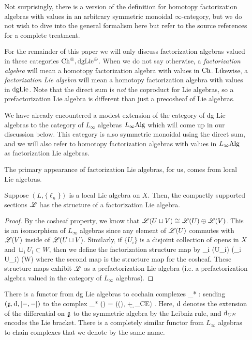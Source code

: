 \documentclass[10pt]{amsart}
\begin{document}
Not surprisingly, there is a version of the definition for homotopy factorization algebras with values in an arbitrary symmetric monoidal $\infty$-category, but we do not wish to dive into the general formalism here but refer to the source references \cite{AF1, LurieHA,..} for a complete treatment.

For the remainder of this paper we will only discuss factorization algebras valued in these categories ${\rm Ch}^\otimes, {\rm dgLie}^{\oplus}$.
When we do not say otherwise, a {\em factorization algebra} will mean a homotopy factorization algebra with values in ${\rm Ch}$. 
Likewise, a {\em factorization Lie algebra} will mean a homotopy factorization algebra with values in ${\rm dgLie}$. 
Note that the direct sum is {\em not} the coproduct for Lie algebras, so a prefactorization Lie algebra is different than just a precosheaf of Lie algebras. 

We have already encountered a modest extension of the category of dg Lie algebras to the category of $L_\infty$ algebras $L_\infty{\rm Alg}$ which will come up in our discussion below.
This category is also symmetric monoidal using the direct sum, and we will also refer to homotopy factorization algebras with values in $L_\infty{\rm Alg}$ as factorization Lie algebras.

The primary appearance of factorization Lie algebras, for us, comes from local Lie algebras.
 
\begin{lem}
Suppose $(L, \{\ell_n\})$ is a local Lie algebra on $X$.
Then, the compactly supported sections $\mathscr L$ has the structure of a factorization Lie algebra.
\end{lem}
\begin{proof}
By the cosheaf property, we know that $\mathscr L(U \sqcup V) \cong \mathscr L(U) \oplus \mathscr L(V)$. 
This is an isomorphism of $L_\infty$ algebras since any element of $\mathscr L(U)$ commutes with $\mathscr L(V)$ inside of $\mathscr L(U \sqcup V)$. 
Similarly, if $\{U_i\}$ is a disjoint collection of opens in $X$ and $\sqcup_i U_i \subset W$, then we define the factorization structure map by
\ben
\oplus_i \sL(U_i) \cong \sL(\sqcup_i U_i) \to \sL (W)
\een
where the second map is the structure map for the cosheaf. 
These structure maps exhibit $\mathscr L$ as a prefactorization Lie algebra (i.e. a prefactorization algebra valued in the category of $L_\infty$ algebras). 
\end{proof}

There is a functor from dg Lie algebras to cochain complexes 
\ben
\clieu_* : \dgLie \to \Ch
\een
sending $(\mathfrak g, {\rm d} , [-,-])$ to the complex
\ben
\clieu_* (\fg) = \left(\Sym(\fg[1]), \d + \d_{CE}\right) .
\een
Here, ${\rm d}$ denotes the extension of the differential on $\mathfrak g$ to the symmetric algebra by the Leibniz rule, and ${\rm d}_{CE}$ encodes the Lie bracket.
There is a completely similar functor from $L_\infty$ algebras to chain complexes that we denote by the same name.
\end{document}
